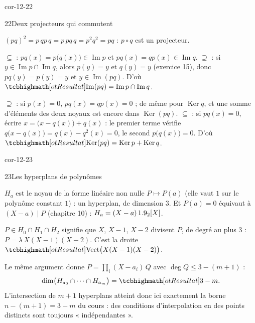 \begin{blocLivre}{cor-12-22}
\begin{corrige}{22}{Deux projecteurs qui commutent}
\begin{questions}
  \item $(pq)^{2}=p\,qp\,q=p\,pq\,q=p^{2}q^{2}=pq$ : $p\circ q$ est un
    projecteur.
  \item $\subseteq$ : $pq(x)=p\bigl(q(x)\bigr)\in\operatorname{Im}p$ et
    $pq(x)=qp(x)\in\operatorname{Im}q$. $\supseteq$ : si
    $y\in\operatorname{Im}p\cap\operatorname{Im}q$, alors $p(y)=y$ et
    $q(y)=y$ (exercice 15), donc $pq(y)=p(y)=y$ et
    $y\in\operatorname{Im}(pq)$. D'où
    $\res{\operatorname{Im}(pq)=\operatorname{Im}p\cap\operatorname{Im}q}$.
  \item $\supseteq$ : si $p(x)=0$, $pq(x)=qp(x)=0$ ; de même pour
    $\operatorname{Ker}q$, et une somme d'éléments des deux noyaux est
    encore dans $\operatorname{Ker}(pq)$. $\subseteq$ : si $pq(x)=0$,
    écrire $x=\bigl(x-q(x)\bigr)+q(x)$ : le premier terme vérifie
    $q\bigl(x-q(x)\bigr)=q(x)-q^{2}(x)=0$, le second
    $p\bigl(q(x)\bigr)=0$. D'où
    $\res{\operatorname{Ker}(pq)=\operatorname{Ker}p+\operatorname{Ker}q}$.
\end{questions}
\end{corrige}
\end{blocLivre}

\begin{blocLivre}{cor-12-23}
\begin{corrige}{23}{Les hyperplans de polynômes}
\begin{questions}
  \item $H_a$ est le noyau de la forme linéaire non nulle $P\mapsto P(a)$
    (elle vaut $1$ sur le polynôme constant $1$) : un hyperplan, de
    dimension $3$. Et $P(a)=0$ équivaut à $(X-a)\mid P$ (chapitre 10) :
    $H_a=(X-a)\,1.9_2[X]$.
  \item $P\in H_0\cap H_1\cap H_2$ signifie que $X$, $X-1$, $X-2$ divisent
    $P$, de degré au plus $3$ : $P=\lambda\,X(X-1)(X-2)$. C'est la droite
    $\res{\operatorname{Vect}\bigl(X(X-1)(X-2)\bigr)}$.
  \item Le même argument donne $P=\prod_{i}(X-a_i)\,Q$ avec
    $\deg Q\leqslant3-(m+1)$ :
    \[
    \dim\bigl(H_{a_0}\cap\dots\cap H_{a_m}\bigr)=\res{3-m}.
    \]
    L'intersection de $m+1$ hyperplans atteint donc ici exactement la
    borne $n-(m+1)=3-m$ du cours : des conditions d'interpolation en des
    points distincts sont toujours « indépendantes ».
\end{questions}
\end{corrige}
\end{blocLivre}

